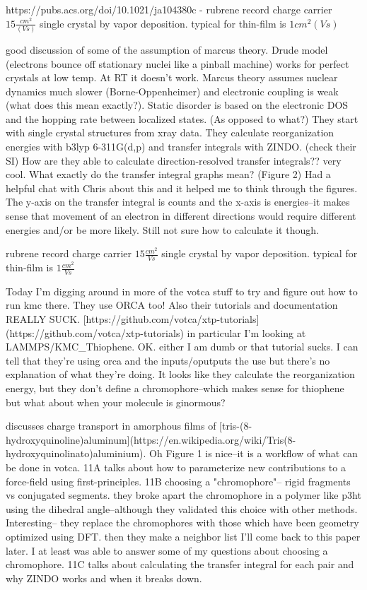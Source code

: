 \documentclass{article}
\begin{document}
https://pubs.acs.org/doi/10.1021/ja104380c - 
rubrene record charge carrier $15 \frac{cm^{2}}{(V s)}$ single crystal by vapor deposition. typical for thin-film is $1 {cm^{2}}{(V s)}$

good discussion of some of the assumption of marcus theory. 
Drude model (electrons bounce off stationary nuclei like a pinball machine) works for perfect crystals at low temp.
At RT it doesn't work. Marcus theory assumes nuclear dynamics much slower (Borne-Oppenheimer) and electronic coupling is weak (what does this mean exactly?). Static disorder is based on the electronic DOS and the hopping rate between localized states. (As opposed to what?)
They start with single crystal structures from xray data. They calculate reorganization energies with b3lyp 6-311G(d,p) and transfer integrals with ZINDO. (check their SI)
How are they able to calculate direction-resolved transfer integrals?? very cool. What exactly do the transfer integral graphs mean? (Figure 2) Had a helpful chat with Chris about this and it helped me to think through the figures. The y-axis on the transfer integral is counts and the x-axis is energies--it makes sense that movement of an electron in different directions would require different energies and/or be more likely. Still not sure how to calculate it though. 

\cite{Vehoff2010a}

rubrene record charge carrier $15 \frac{cm^{2}}{V s}$ single crystal by vapor deposition. typical for thin-film is $1 \frac{cm^{2}}{V s}$

Today I'm digging around in more of the votca stuff to try and figure out how to run kmc there. They use ORCA too! Also their tutorials and documentation REALLY SUCK. [https://github.com/votca/xtp-tutorials](https://github.com/votca/xtp-tutorials) in particular I'm looking at LAMMPS/KMC\_Thiophene.
OK. either I am dumb or that tutorial sucks. I can tell that they're using orca and the inputs/oputputs the use but there's no explanation of what they're doing. It looks like they calculate the reorganization energy, but they don't define a chromophore--which makes sense for thiophene but what about when your molecule is ginormous?

\cite{Ruhle2011b} 

discusses charge transport in amorphous films of [tris-(8-hydroxyquinoline)aluminum](https://en.wikipedia.org/wiki/Tris(8-hydroxyquinolinato)aluminium). Oh Figure 1 is nice--it is a workflow of what can be done in votca.
11A talks about how to parameterize new contributions to a force-field using first-principles.
11B choosing a "chromophore"-- rigid fragments vs conjugated segments. they broke apart the chromophore in a polymer like p3ht using the dihedral angle--although they validated this choice with other methods. Interesting-- they replace the chromophores with those which have been geometry optimized using DFT. then they make a neighbor list
I'll come back to this paper later. I at least was able to answer some of my questions about choosing a chromophore.
11C talks about calculating the transfer integral for each pair and why ZINDO works and when it breaks down.
\end{document}
